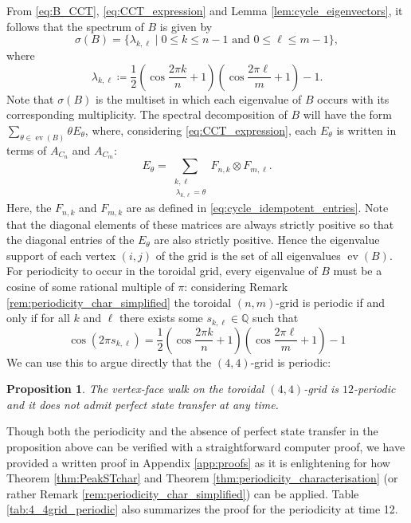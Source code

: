 \documentclass{article}
\newtheorem{proposition}[theorem]{Proposition}
\numberwithin{equation}{section}
\DeclareMathOperator\ev{ev}
\newcommand\rats{{\mathbb Q}}
\begin{document}
From \eqref{eq:B_CCT}, \eqref{eq:CCT_expression} and Lemma \ref{lem:cycle_eigenvectors}, it follows that the spectrum of $B$ is given by
\[
\sigma(B) = \{\lambda_{k,\ell} \mid 0 \leq k \leq n-1 \text{ and } 0 \leq \ell \leq m-1\},
\]
where
\begin{equation}
\label{eq:toroidal_B_eigs}
\lambda_{k,\ell} \coloneq \frac{1}{2}\left(\cos \frac{2 \pi k}{n} + 1\right)\left(\cos \frac{2 \pi \ell}{m} + 1\right) -1.
\end{equation}
Note that $\sigma(B)$ is the multiset in which each eigenvalue of $B$ occurs with its corresponding multiplicity. The spectral decomposition of $B$ will have the form $\sum_{\theta \in \ev(B)}\theta E_\theta$, where, considering \eqref{eq:CCT_expression}, each $E_\theta$ is written in terms of $A_{C_n}$ and $A_{C_m}$:
\[
E_\theta = \sum_{\substack{k,\ell \\\, \lambda_{k,\ell} = \theta}} F_{n,k} \otimes F_{m,\ell}.
\]
Here, the $F_{n,k}$ and $F_{m,k}$ are as defined in \eqref{eq:cycle_idempotent_entries}. Note that the diagonal elements of these matrices are always strictly positive so that the diagonal entries of the $E_\theta$ are also strictly positive. Hence the eigenvalue support of each vertex $(i,j)$ of the grid is the set of all eigenvalues $\ev(B)$. For periodicity to occur in the toroidal grid, every eigenvalue of $B$ must be a cosine of some rational multiple of $\pi$: considering Remark \ref{rem:periodicity_char_simplified}
the toroidal $(n,m)$-grid is periodic if and only if for all $k$ and $\ell$ there exists some $s_{k,\ell} \in \rats$ such that
\begin{equation}
\label{eq:vxf_grid_cos_equation}
\cos(2\pi s_{k,\ell}) = \frac{1}{2}\left(\cos \frac{2 \pi k}{n} + 1\right)\left(\cos \frac{2 \pi \ell}{m} + 1\right) -1
\end{equation}
We can use this to argue directly that the $(4,4)$-grid is periodic:
\begin{proposition}
\label{prop:4_4grid_periodic}
The vertex-face walk on the toroidal $(4,4)$-grid is $12$-periodic and it does not admit perfect state transfer at any time.
\end{proposition}
Though both the periodicity and the absence of perfect state transfer in the proposition above can be verified with a straightforward computer proof, we have provided a written proof in Appendix \ref{app:proofs} as it is enlightening for how Theorem \ref{thm:PeakSTchar} and Theorem \ref{thm:periodicity_characterisation} (or rather Remark \ref{rem:periodicity_char_simplified}) can be applied. Table \ref{tab:4_4grid_periodic} also summarizes the proof for the periodicity at time 12.
\end{document}
